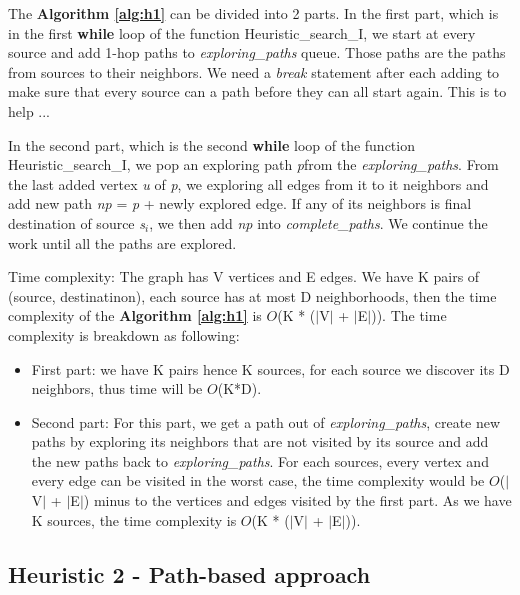 The \textbf{Algorithm \ref{alg:h1}} can be divided into 2 parts. In the first part, which is in the first \textbf{while} loop of the function Heuristic\_search\_I, we start at every source and add 1-hop paths to \textit{exploring\_paths} queue. Those paths are the paths from sources to their neighbors. We need a \textit{break} statement after each adding to make sure that every source can a path before they can all start again. This is to help ...

In the second part, which is the second \textbf{while} loop of the function Heuristic\_search\_I, we pop an exploring path \textit{p}from the \textit{exploring\_paths}. From the last added vertex \textit{u} of \textit{p}, we exploring all edges from it to it neighbors and add new path \textit{np} = \textit{p} + newly explored edge. If any of its neighbors is final destination of source \textit{s$_i$}, we then add \textit{np} into \textit{complete\_paths}. We continue the work until all the paths are explored.

Time complexity: The graph has V vertices and E edges. We have K pairs of (source, destinatinon), each source has at most D neighborhoods, then the time complexity of the \textbf{Algorithm \ref{alg:h1}} is $O$(K * ($|$V$|$ + $|$E$|$)). The time complexity is breakdown as following:
\begin{itemize}
\item First part: we have K pairs hence K sources, for each source we discover its D neighbors, thus time will be $O$(K*D).
\item Second part: For this part, we get a path out of \textit{exploring\_paths}, create new paths by exploring its neighbors that are not visited by its source and add the new paths back to \textit{exploring\_paths}. For each sources, every vertex and every edge can be visited in the worst case, the time complexity would be $O$($|$V$|$ + $|$E$|$) minus to the vertices and edges visited by the first part. As we have K sources, the time complexity is $O$(K * ($|$V$|$ + $|$E$|$)).
\end{itemize}

\subsection{Heuristic 2 - Path-based approach}

